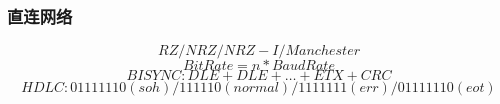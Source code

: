 \documentclass[UTF8,cs4size]{ctexart}
\begin{document}
\subsubsection{直连网络}
$$RZ/NRZ/NRZ-I/Manchester$$
$$BitRate = n * BaudRate$$
$$BISYNC:DLE + DLE + \dots + ETX + CRC$$
$$HDLC:01111110(soh)/111110(normal)/1111111(err)/01111110(eot)$$
\end{document}
